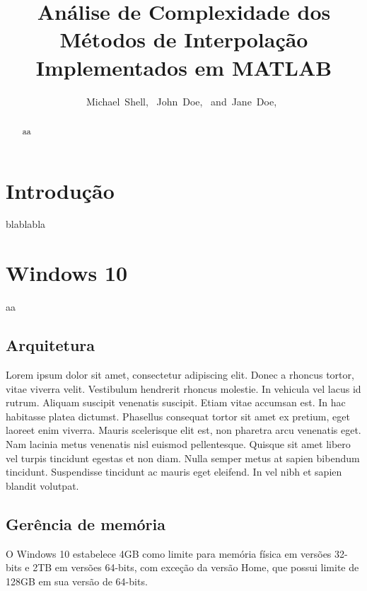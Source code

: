 \documentclass[journal]{IEEEtran}
\title{Análise de Complexidade dos Métodos de Interpolação Implementados em MATLAB}
\author{Michael~Shell,~\IEEEmembership{Member,~IEEE,}
        John~Doe,~\IEEEmembership{Fellow,~OSA,}
        and~Jane~Doe,~\IEEEmembership{Life~Fellow,~IEEE}}%
\begin{document}
 

\maketitle
     
\begin{abstract} 
	aa
\end{abstract}

\section{Introdução}
	blablabla
	
\section{Windows 10}
	aa
\subsection{Arquitetura}
Lorem ipsum dolor sit amet, consectetur adipiscing elit. Donec a rhoncus tortor, vitae viverra velit. Vestibulum hendrerit rhoncus molestie. In vehicula vel lacus id rutrum. Aliquam suscipit venenatis suscipit. Etiam vitae accumsan est. In hac habitasse platea dictumst. Phasellus consequat tortor sit amet ex pretium, eget laoreet enim viverra. Mauris scelerisque elit est, non pharetra arcu venenatis eget. Nam lacinia metus venenatis nisl euismod pellentesque. Quisque sit amet libero vel turpis tincidunt egestas et non diam. Nulla semper metus at sapien bibendum tincidunt. Suspendisse tincidunt ac mauris eget eleifend. In vel nibh et sapien blandit volutpat. 

\subsection{Gerência de memória}
	O Windows 10 estabelece 4GB como limite para memória física em versões 32-bits e 2TB em versões 64-bits, com exceção da versão Home, que possui limite de 128GB em sua versão de 64-bits.
	
\end{document}
